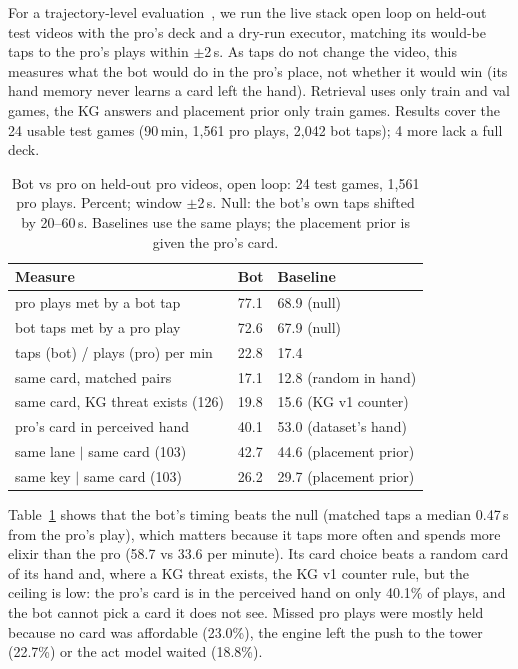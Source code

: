 For a trajectory-level evaluation~\cite{yao2025taubench}, we run the live stack open loop on held-out test videos with the pro's deck and a dry-run executor, matching its would-be taps to the pro's plays within $\pm$2\,s. As taps do not change the video, this measures what the bot would do in the pro's place, not whether it would win (its hand memory never learns a card left the hand). Retrieval uses only train and val games, the KG answers and placement prior only train games. Results cover the 24 usable test games (90\,min, 1,561 pro plays, 2,042 bot taps); 4 more lack a full deck. %

\begin{table}[t]
\caption{Bot vs pro on held-out pro videos, open loop: 24 test games, 1,561 pro plays. Percent; window $\pm$2\,s. Null: the bot's own taps shifted by 20--60\,s. Baselines use the same plays; the placement prior is given the pro's card.}
\label{tab:vspro}
\centering\scriptsize
\setlength{\tabcolsep}{3pt}
\begin{tabular}{@{}lll@{}}
\toprule
Measure & Bot & Baseline\\
\midrule
pro plays met by a bot tap & 77.1 & 68.9 (null)\\
bot taps met by a pro play & 72.6 & 67.9 (null)\\
taps (bot) / plays (pro) per min & 22.8 & 17.4\\
same card, matched pairs & 17.1 & 12.8 (random in hand)\\
same card, KG threat exists (126) & 19.8 & 15.6 (KG v1 counter)\\
pro's card in perceived hand & 40.1 & 53.0 (dataset's hand)\\
same lane $\mid$ same card (103) & 42.7 & 44.6 (placement prior)\\
same key $\mid$ same card (103) & 26.2 & 29.7 (placement prior)\\
\bottomrule
\end{tabular}
\end{table}

Table~\ref{tab:vspro} shows that the bot's timing beats the null (matched taps a median 0.47\,s from the pro's play), which matters because it taps more often and spends more elixir than the pro (58.7 vs 33.6 per minute). Its card choice beats a random card of its hand and, where a KG threat exists, the KG v1 counter rule, but the ceiling is low: the pro's card is in the perceived hand on only 40.1\% of plays, and the bot cannot pick a card it does not see. Missed pro plays were mostly held because no card was affordable (23.0\%), the engine left the push to the tower (22.7\%) or the act model waited (18.8\%). %

